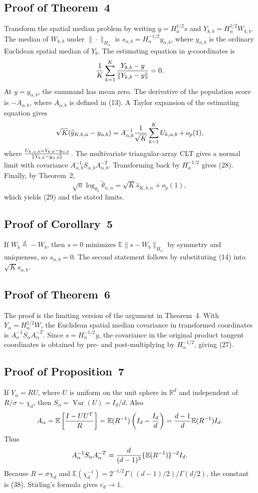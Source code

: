 \documentclass[11pt]{article}
\newcommand{\R}{\mathbb R}
\newcommand{\E}{\mathbb E}
\newcommand{\Var}{\operatorname{Var}}
\begin{document}
\subsection{Proof of Theorem~4}
Transform the spatial median problem by writing \(y=H_\alpha^{1/2}s\) and \(Y_{k,b}=H_\alpha^{1/2}W_{k,b}\).  The median of \(W_{k,b}\) under \(\|\cdot\|_{H_\alpha}\) is \(s_{\alpha,b}=H_\alpha^{-1/2}y_{\alpha,b}\), where \(y_{\alpha,b}\) is the ordinary Euclidean spatial median of \(Y_b\).  The estimating equation in \(y\)-coordinates is
\[
    {1\over K}\sum_{k=1}^K {Y_{k,b}-y\over\|Y_{k,b}-y\|}=0.
\]
At \(y=y_{\alpha,b}\), the summand has mean zero.  The derivative of the population score is \(-A_{\alpha,b}\), where \(A_{\alpha,b}\) is defined in (13).  A Taylor expansion of the estimating equation gives
\[
    \sqrt K(\widehat y_{K,b,\alpha}-y_{\alpha,b})
    =A_{\alpha,b}^{-1}{1\over\sqrt K}\sum_{k=1}^K U_{k,\alpha,b}+o_p(1),
\]
where \(U_{k,\alpha,b}=Y_{k,b}-y_{\alpha,b}\over \|Y_{k,b}-y_{\alpha,b}\|\).  The multivariate triangular-array CLT gives a normal limit with covariance \(A_{\alpha,b}^{-1}S_{\alpha,b}A_{\alpha,b}^{-T}\).  Transforming back by \(H_\alpha^{-1/2}\) gives (28).  Finally, by Theorem~2,
\[
    \sqrt n\log_{\theta_0}\widetilde\theta_{n,\alpha}
    =\sqrt K\widehat s_{K,b,\alpha}+o_p(1),
\]
which yields (29) and the stated limits.


\subsection{Proof of Corollary~5}
If \(W_b\stackrel d=-W_b\), then \(s=0\) minimizes \(\E\|s-W_b\|_{H_\alpha}\) by symmetry and uniqueness, so \(s_{\alpha,b}=0\).  The second statement follows by substituting (14) into \(\sqrt K s_{\alpha,b}\).


\subsection{Proof of Theorem~6}
The proof is the limiting version of the argument in Theorem~4.  With \(Y_\alpha=H_\alpha^{1/2}W\), the Euclidean spatial median covariance in transformed coordinates is \(A_\alpha^{-1}S_\alpha A_\alpha^{-T}\).  Since \(s=H_\alpha^{-1/2}y\), the covariance in the original product tangent coordinates is obtained by pre- and post-multiplying by \(H_\alpha^{-1/2}\), giving (27).

\subsection{Proof of Proposition~7}
If \(Y_\alpha=RU\), where \(U\) is uniform on the unit sphere in \(\R^d\) and independent of \(R/\sigma\sim\chi_d\), then \(S_\alpha=\Var(U)=I_d/d\).  Also
\[
    A_\alpha=\E\left[{I-UU^T\over R}\right]
    =\E(R^{-1})\left(I_d-{I_d\over d}\right)
    ={d-1\over d}\E(R^{-1})I_d.
\]
Thus
\[
    A_\alpha^{-1}S_\alpha A_\alpha^{-T}
    ={d\over(d-1)^2}\{\E(R^{-1})\}^{-2}I_d.
\]
Because \(R=\sigma\chi_d\) and \(\E(\chi_d^{-1})=2^{-1/2}\Gamma((d-1)/2)/\Gamma(d/2)\), the constant is (38).  Stirling's formula gives \(c_d\to1\).
\end{document}
